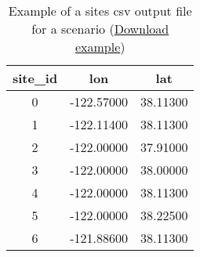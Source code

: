 \begin{table}[htbp]
\centering
\begin{tabular}{ccc}

\hline
\rowcolor{lightgray}
\textbf{site\_id} & \textbf{lon} & \textbf{lat} \\
\hline
0 & -122.57000 & 38.11300 \\
1 & -122.11400 & 38.11300 \\
2 & -122.00000 & 37.91000 \\
3 & -122.00000 & 38.00000 \\
4 & -122.00000 & 38.11300 \\
5 & -122.00000 & 38.22500 \\
6 & -121.88600 & 38.11300 \\
\hline

\end{tabular} \caption{Example of a sites csv output file for a scenario (\href{https://raw.githubusercontent.com/gem/oq-engine/master/doc/manual/oqum/hazard/verbatim/output_scenario_sites.csv}{Download example})}
\label{output:sitemesh}
\end{table}